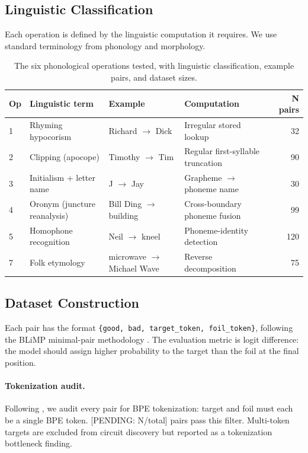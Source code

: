 \documentclass{article}
\newcommand{\PENDING}[1]{{\color{blue}[PENDING: #1]}}
\begin{document}
\subsection{Linguistic Classification}

Each operation is defined by the linguistic computation it requires. We use
standard terminology from phonology and morphology.

\begin{table}[h!]
\centering
\caption{The six phonological operations tested, with linguistic classification,
example pairs, and dataset sizes.}
\label{tab:operations}
\small
\begin{tabular}{llllr}
\toprule
\textbf{Op} & \textbf{Linguistic term} & \textbf{Example} & \textbf{Computation} & \textbf{N pairs} \\
\midrule
1 & Rhyming hypocorism & Richard $\to$ Dick & Irregular stored lookup & 32 \\
2 & Clipping (apocope) & Timothy $\to$ Tim & Regular first-syllable truncation & 90 \\
3 & Initialism + letter name & J $\to$ Jay & Grapheme $\to$ phoneme name & 30 \\
4 & Oronym (juncture reanalysis) & Bill Ding $\to$ building & Cross-boundary phoneme fusion & 99 \\
5 & Homophone recognition & Neil $\to$ kneel & Phoneme-identity detection & 120 \\
7 & Folk etymology & microwave $\to$ Michael Wave & Reverse decomposition & 75 \\
\bottomrule
\end{tabular}
\end{table}

\subsection{Dataset Construction}

Each pair has the format \texttt{\{good, bad, target\_token, foil\_token\}},
following the BLiMP minimal-pair methodology \citep{warstadt2020blimp}. The
evaluation metric is logit difference: the model should assign higher
probability to the target than the foil at the final position.

\paragraph{Tokenization audit.}
Following \citet{liao2026tokenization}, we audit every pair for BPE
tokenization: target and foil must each be a single BPE token.
\PENDING{N/total} pairs pass this filter. Multi-token targets are excluded
from circuit discovery but reported as a tokenization bottleneck finding.
\end{document}
